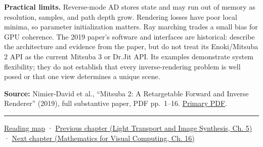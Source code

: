 \textbf{Practical limits.} Reverse-mode AD stores state and may run out of memory as resolution, samples, and path depth grow. Rendering losses have poor local minima, so parameter initialization matters. Ray marching trades a small bias for GPU coherence. The 2019 paper's software and interfaces are historical: describe the architecture and evidence from the paper, but do not treat its Enoki/Mitsuba 2 API as the current Mitsuba 3 or Dr.Jit API. Its examples demonstrate system flexibility; they do not establish that every inverse-rendering problem is well posed or that one view determines a unique scene.

\textbf{Source:} Nimier-David et al., ``Mitsuba 2: A Retargetable Forward and Inverse Renderer'' (2019), full substantive paper, PDF pp.~1--16. \href{https://rgl.s3.eu-central-1.amazonaws.com/media/papers/NimierDavidVicini2019Mitsuba2_7.pdf}{Primary PDF}.

\begin{center}\rule{0.5\linewidth}{0.5pt}\end{center}

\hyperref[volume-reading-map]{Reading map} · \href{../04-Light-Transport-and-Image-Synthesis/main.pdf\#nameddest=03-visual-computing-i-ch010-a-production-path-tracer-media-randomness-and-validation}{Previous chapter (Light Transport and Image Synthesis, Ch. 5)} · \href{../02-Mathematics-for-Visual-Computing/main.pdf\#nameddest=03-visual-computing-i-ch012-probability-statistics-and-uncertainty}{Next chapter (Mathematics for Visual Computing, Ch. 16)}
